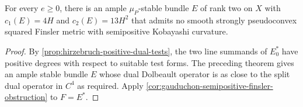 \begin{corollary}\label{cor:hirzebruch-stable-ample-finsler-obstruction}
For every $e\geq0$, there is an ample $\mu_P$-stable bundle $E$ of rank two on $X$ with $c_1(E)=4H$ and $c_2(E)=13H^2$ that admits no smooth strongly pseudoconvex squared Finsler metric with semipositive Kobayashi curvature.
\end{corollary}
\begin{proof}
By \cref{prop:hirzebruch-positive-dual-tests}, the two line summands of $E_0^*$ have positive degrees with respect to suitable test forms. The preceding theorem gives an ample stable bundle $E$ whose dual Dolbeault operator is as close to the split dual operator in $C^4$ as required. Apply \cref{cor:gauduchon-semipositive-finsler-obstruction} to $F=E^*$.
\end{proof}
